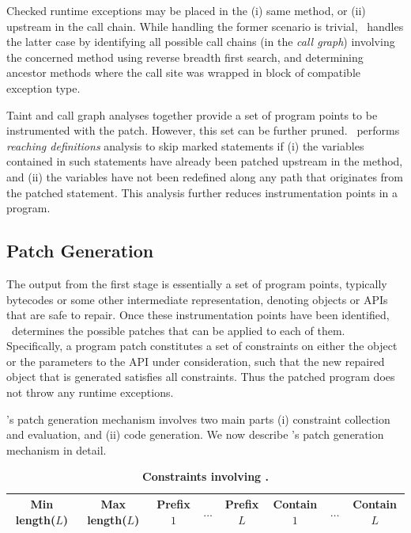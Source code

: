 Checked runtime exceptions may be placed in the (i) same method, or (ii)
upstream in the call chain. While handling the former scenario is trivial,
\tool\ handles the latter case by identifying all possible call chains (in
the \textit{call graph}) involving the concerned method using reverse breadth
first search, and determining ancestor methods where the call site was wrapped in
 block of compatible exception type.

 Taint and call graph analyses
together provide a set of program points to be instrumented with the
patch. However, this set can be further pruned. \tool\ performs \textit{reaching
definitions} analysis to skip marked statements if
(i) the  variables contained in such statements have already been
patched upstream in the method, and (ii) the variables have not been redefined along any
path that originates from the patched statement. This analysis further reduces
instrumentation points in a program.

\subsection{Patch Generation}
\label{sec:tool:stage2}

The output from the first stage is essentially a set of program points,
typically bytecodes or some other intermediate representation, denoting
 objects or APIs that are safe to repair. Once these
instrumentation points have been identified, \tool\ determines the
possible patches that can be applied to each of them. Specifically, a program
patch constitutes a set of constraints on either the  object or the
parameters to the  API under consideration, such that the new
repaired  object that is generated satisfies all constraints. Thus
the patched program does not throw any runtime exceptions.

\tool's patch generation mechanism involves two main parts (i) constraint
collection and evaluation, and (ii) code generation. We now describe \tool's
patch generation mechanism in detail. 


\begin{table}[t]
\centering
\caption{\bf Constraints involving .}
\scriptsize
\setlength{\tabcolsep}{2.5pt}
\begin{tabular}{|c|c|c|c|c|c|c|c|}
\hline
Min length($L$) & Max length($L$) & Prefix $1$ & $\ldots$ & Prefix$L$ & Contain
$1$ & $\ldots$ & Contain $L$\\
\hline
\end{tabular}
\label{table:constraint}
\end{table}

